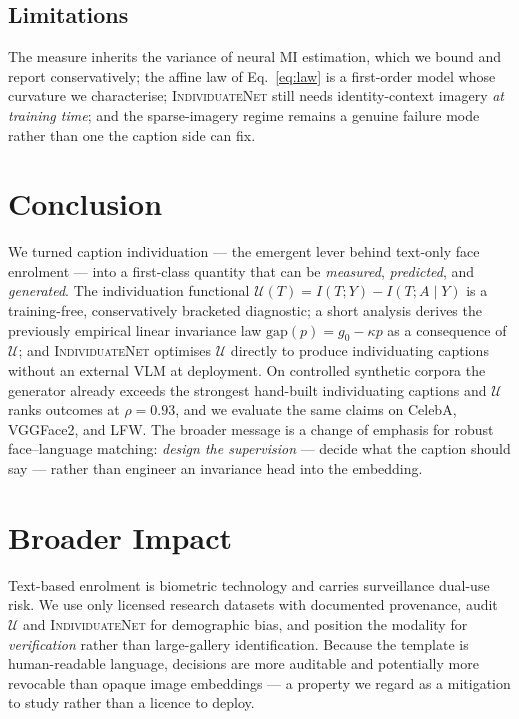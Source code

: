 \documentclass[10pt,twocolumn,letterpaper]{article}
\newcommand{\U}{\mathcal{U}}
\newcommand{\method}{\textsc{IndividuateNet}}
\begin{document}
\subsection{Limitations}
\label{sec:limits}
The measure inherits the variance of neural MI estimation, which we bound and report
conservatively; the affine law of Eq.~\ref{eq:law} is a first-order model whose curvature we
characterise; \method{} still needs identity-context imagery \emph{at training time}; and the
sparse-imagery regime remains a genuine failure mode rather than one the caption side can fix.

\section{Conclusion}
\label{sec:conclusion}
We turned caption individuation --- the emergent lever behind text-only face enrolment --- into
a first-class quantity that can be \emph{measured}, \emph{predicted}, and \emph{generated}. The
individuation functional $\U(T)=I(T;Y)-I(T;A\mid Y)$ is a training-free, conservatively bracketed
diagnostic; a short analysis derives the previously empirical linear invariance law
$\mathrm{gap}(p)=g_0-\kappa p$ as a consequence of $\U$; and \method{} optimises $\U$ directly to
produce individuating captions without an external VLM at deployment. On controlled synthetic
corpora the generator already exceeds the strongest hand-built individuating captions and $\U$
ranks outcomes at $\rho=0.93$, and we evaluate the same claims on CelebA, VGGFace2, and LFW. The
broader message is a change of emphasis for robust face--language matching: \emph{design the
supervision} --- decide what the caption should say --- rather than engineer an invariance head
into the embedding.

\section{Broader Impact}
\label{sec:impact}
Text-based enrolment is biometric technology and carries surveillance dual-use risk. We use only
licensed research datasets with documented provenance, audit $\U$ and \method{} for demographic
bias, and position the modality for \emph{verification} rather than large-gallery identification.
Because the template is human-readable language, decisions are more auditable and potentially
more revocable than opaque image embeddings --- a property we regard as a mitigation to study
rather than a licence to deploy.
\end{document}

